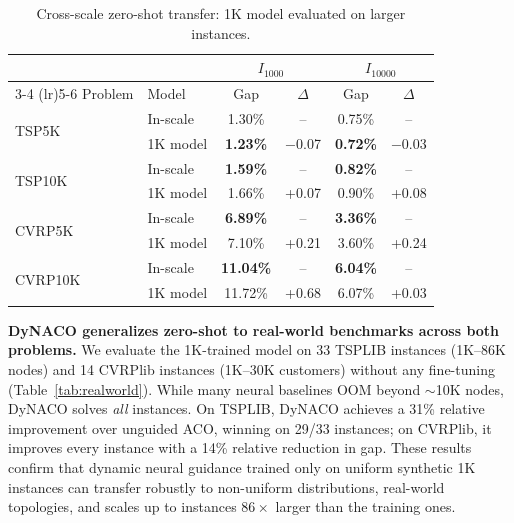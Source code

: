 \documentclass[sigconf]{acmart}
\newcommand{\TSP}{\textsc{TSP}}
\newcommand{\CVRP}{\textsc{CVRP}}
\begin{document}
\begin{table}[t]
\centering
\caption{Cross-scale zero-shot transfer: 1K model evaluated on larger instances.}
\label{tab:cross-scale}
\small
\renewcommand{\arraystretch}{0.80}
\begin{tabular*}{\columnwidth}{@{\extracolsep{\fill}}llcccc@{}}
\toprule
& & \multicolumn{2}{c}{$I_{1000}$} & \multicolumn{2}{c}{$I_{10000}$} \\
\cmidrule(lr){3-4} \cmidrule(lr){5-6}
Problem & Model & Gap & $\Delta$ & Gap & $\Delta$ \\
\midrule
\multirow{2}{*}{\TSP{}5K}
  & In-scale  & 1.30\% & --       & 0.75\% & --       \\
  & 1K model  & \textbf{1.23\%} & $-$0.07  & \textbf{0.72\%} & $-$0.03  \\
\midrule
\multirow{2}{*}{\TSP{}10K}
  & In-scale  & \textbf{1.59\%} & --       & \textbf{0.82\%} & --       \\
  & 1K model  & 1.66\% & +0.07    & 0.90\% & +0.08    \\
\midrule
\multirow{2}{*}{\CVRP{}5K}
  & In-scale  & \textbf{6.89\%} & --       & \textbf{3.36\%} & --       \\
  & 1K model  & 7.10\% & +0.21    & 3.60\% & +0.24    \\
\midrule
\multirow{2}{*}{\CVRP{}10K}
  & In-scale  & \textbf{11.04\%} & --      & \textbf{6.04\%} & --       \\
  & 1K model  & 11.72\% & +0.68   & 6.07\% & +0.03    \\
\bottomrule
\end{tabular*}
\end{table}

\smallskip\noindent\textbf{DyNACO generalizes zero-shot to real-world benchmarks across both problems.}
We evaluate the 1K-trained model on 33 TSPLIB instances (1K--86K nodes) and 14 CVRPlib instances (1K--30K customers) without any fine-tuning (Table~\ref{tab:realworld}).
While many neural baselines OOM beyond $\sim$10K nodes, DyNACO solves \emph{all} instances.
On TSPLIB, DyNACO achieves a 31\% relative improvement over unguided ACO, winning on 29/33 instances; on CVRPlib, it improves every instance with a 14\% relative reduction in gap.
These results confirm that dynamic neural guidance trained only on uniform synthetic 1K instances can transfer robustly to non-uniform distributions, real-world topologies, and scales up to instances $86{\times}$ larger than the training ones.
\end{document}
